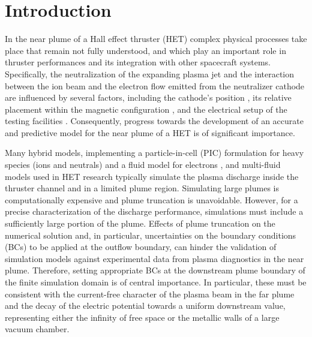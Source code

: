 \documentclass[%
 aip,
cha,
 amsmath,amssymb,
 reprint,%
]{revtex4-1}
\begin{document}
\maketitle


\section{Introduction}\label{sec: intro}


In the near plume of a Hall effect thruster (HET) complex physical processes take place that remain not fully understood, and which play an important role in thruster performances and its integration with other spacecraft systems.
Specifically, the neutralization of the expanding plasma jet and the interaction between the ion beam and the electron flow emitted from the neutralizer cathode are influenced by several factors, including the cathode's position \cite{till99,jame07,beal07,hofe08b,mcdo09,somm08}, its relative placement within the magnetic configuration \cite{somm11b,tura16,yu17,ding18}, and the electrical setup of the testing facilities \cite{frie14,frie16a,walk16a,walk16b}.
Consequently, progress towards the development of an accurate and predictive model for the near plume of a HET is of significant importance.

Many hybrid models, implementing a particle-in-cell (PIC) formulation for heavy species (ions and neutrals) and a fluid model for electrons \cite{fife98,hage02,parr06a,garr06,somm07,pera22b,cich21a}, and multi-fluid \cite{mike12b,keid04,ande18b} models used in HET research typically simulate the plasma discharge inside the thruster channel and in a limited plume region.
Simulating large plumes is computationally expensive and plume truncation is unavoidable. However, for a precise characterization of the discharge performance, simulations must include a sufficiently large portion of the plume.  Effects of plume truncation on the numerical solution and, in particular, uncertainties on the boundary conditions (BCs) to be applied at the outflow boundary, can hinder the validation of simulation models against experimental data from plasma diagnostics in the near plume. 
Therefore, setting appropriate BCs at the downstream plume boundary of the finite simulation domain is of central importance.
In particular, these must be consistent with the current-free character of the plasma beam in the far plume and the decay of the electric potential towards a uniform downstream value, representing either the infinity of free space or the metallic walls of a large vacuum chamber.
\end{document}
